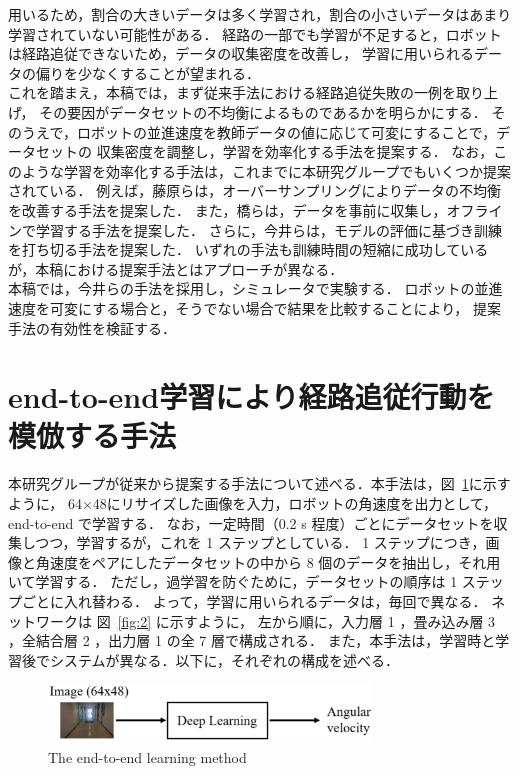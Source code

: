 \documentclass{jarticle}
\renewcommand{\figurename}{図~}
\newcommand{\figref}[1]{\figurename\ref{#1}}
\begin{document}
用いるため，割合の大きいデータは多く学習され，割合の小さいデータはあまり学習されていない可能性がある．
経路の一部でも学習が不足すると，ロボットは経路追従できないため，データの収集密度を改善し，
学習に用いられるデータの偏りを少なくすることが望まれる．\\
\hspace*{1zw}これを踏まえ，本稿では，まず従来手法における経路追従失敗の一例を取り上げ，
その要因がデータセットの不均衡によるものであるかを明らかにする．
そのうえで，ロボットの並進速度を教師データの値に応じて可変にすることで，データセットの
収集密度を調整し，学習を効率化する手法を提案する．
なお，このような学習を効率化する手法は，これまでに本研究グループでもいくつか提案されている．
例えば，藤原らは，オーバーサンプリングによりデータの不均衡を改善する手法を提案した\cite{fuji}．
また，橋らは，データを事前に収集し，オフラインで学習する手法を提案した\cite{takahashi}．
さらに，今井らは，モデルの評価に基づき訓練を打ち切る手法を提案した\cite{imai2}．
いずれの手法も訓練時間の短縮に成功しているが，本稿における提案手法とはアプローチが異なる．\\
\hspace*{1zw}本稿では，今井らの手法を採用し，シミュレータで実験する．
ロボットの並進速度を可変にする場合と，そうでない場合で結果を比較することにより，
提案手法の有効性を検証する．


\section{end-to-end学習により経路追従行動を模倣する手法}
本研究グループが従来から提案する手法について述べる．本手法は，\figref{fig:1}に示すように，
64×48にリサイズした画像を入力，ロボットの角速度を出力として， end-to-end で学習する．
なお，一定時間（0.2 s 程度）ごとにデータセットを収集しつつ，学習するが，これを 1 ステップとしている．
1 ステップにつき，画像と角速度をペアにしたデータセットの中から 8 個のデータを抽出し，それ用いて学習する．
ただし，過学習を防ぐために，データセットの順序は 1 ステップごとに入れ替わる．
よって，学習に用いられるデータは，毎回で異なる．
ネットワークは \figref{fig:2} に示すように，
左から順に，入力層 1 ，畳み込み層 3 ，全結合層 2 ，出力層 1 の全 7 層で構成される．
また，本手法は，学習時と学習後でシステムが異なる．以下に，それぞれの構成を述べる．


\begin{figure}[h!]
  \centering
   \includegraphics[height=15.5mm]{./pdf/deplearning1.pdf}
   \caption{The end-to-end learning method}
   \label{fig:1}
\end{figure}
\end{document}
